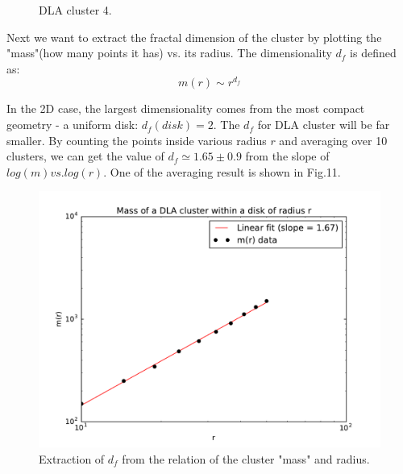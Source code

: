 \documentclass[aps,prl,preprint,superscriptaddress]{revtex4}
\begin{document}
\begin{enumerate}
\begin{figure}[H]
			\caption{DLA cluster 4.}
		\end{figure}
\end{enumerate}

Next we want to extract the fractal dimension of the cluster by plotting the "mass"(how many points it has) vs. its radius. The dimensionality $d_f$ is defined as:
\begin{equation}
m(r) \sim r^{d_f}
\end{equation}

In the 2D case, the largest dimensionality comes from the most compact geometry - a uniform disk: $d_f(disk) = 2$. The $d_f$ for DLA cluster will be far smaller. By counting the points inside various radius $r$ and averaging over 10 clusters, we can get the value of $d_f \simeq 1.65\pm 0.9$ from the slope of $log(m) vs. log(r)$. One of the averaging result is shown in Fig.11.
\begin{figure}[H]
	\centering
	\includegraphics[width=1.0\textwidth]{mass_vs_R.pdf}
	\caption{Extraction of $d_f$ from the relation of the cluster "mass" and radius.}
\end{figure}

 
	
\end{document}

